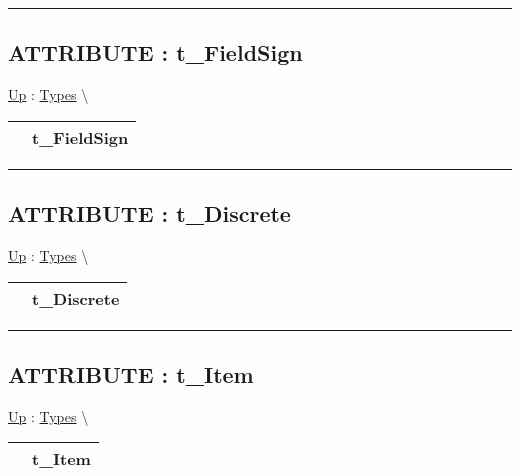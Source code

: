 \par


\rule{\linewidth}{0.5pt}
\subsection*{ATTRIBUTE : t\_FieldSign}
\hypertarget{ecldoc:ml_core.types.t_fieldsign}{}
\hyperlink{ecldoc:ML_Core.Types}{Up} :
\hspace{0pt} \hyperlink{ecldoc:ML_Core.Types}{Types} \textbackslash 

{\renewcommand{\arraystretch}{1.5}
\begin{tabularx}{\textwidth}{|>{\raggedright\arraybackslash}l|X|}
\hline
\hspace{0pt} & t\_FieldSign \\
\hline
\end{tabularx}
}

\par


\rule{\linewidth}{0.5pt}
\subsection*{ATTRIBUTE : t\_Discrete}
\hypertarget{ecldoc:ml_core.types.t_discrete}{}
\hyperlink{ecldoc:ML_Core.Types}{Up} :
\hspace{0pt} \hyperlink{ecldoc:ML_Core.Types}{Types} \textbackslash 

{\renewcommand{\arraystretch}{1.5}
\begin{tabularx}{\textwidth}{|>{\raggedright\arraybackslash}l|X|}
\hline
\hspace{0pt} & t\_Discrete \\
\hline
\end{tabularx}
}

\par


\rule{\linewidth}{0.5pt}
\subsection*{ATTRIBUTE : t\_Item}
\hypertarget{ecldoc:ml_core.types.t_item}{}
\hyperlink{ecldoc:ML_Core.Types}{Up} :
\hspace{0pt} \hyperlink{ecldoc:ML_Core.Types}{Types} \textbackslash 

{\renewcommand{\arraystretch}{1.5}
\begin{tabularx}{\textwidth}{|>{\raggedright\arraybackslash}l|X|}
\hline
\hspace{0pt} & t\_Item \\
\hline
\end{tabularx}
}

